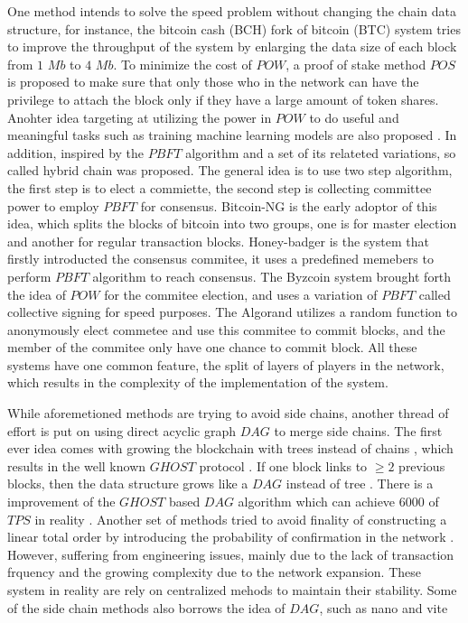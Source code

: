 One method intends to solve the speed problem without changing the chain data structure, for instance, 
the bitcoin cash (BCH) fork of bitcoin (BTC) system tries to improve the throughput of the system by enlarging the data size of each block from $1$ $Mb$ to $4$ $Mb$. 
To minimize the cost of $POW$, a proof of stake method $POS$ \cite{wood2014ethereum} is proposed to make sure that only those who in the network can have the privilege to attach the block only if they have a large amount of token shares.
Anohter idea targeting at utilizing the power in $POW$ to do useful and meaningful tasks such as training machine learning models are also proposed \cite{matthew2017aion}.
In addition, inspired by the $PBFT$ algorithm \cite{castro1999practical} and a set of its relateted variations, so called hybrid chain was proposed. 
The general idea is to use two step algorithm, the first step is to elect a commiette, the second step is collecting committee power to employ $PBFT$ for consensus.
Bitcoin-NG \cite{eyal2016bitcoin} is the early adoptor of this idea, which splits the blocks of bitcoin into two groups, one is for master election and another for regular transaction blocks. 
Honey-badger \cite{miller2016honey} is the system that firstly introducted the consensus commitee, it uses a predefined memebers to perform $PBFT$ algorithm to reach consensus.  
The Byzcoin system \cite{kogias2016enhancing} brought forth the idea of $POW$ for the commitee election, and uses a variation of $PBFT$ called collective signing for speed purposes.
The Algorand \cite{gilad2017algorand} utilizes a random function to anonymously elect commetee and use this commitee to commit blocks, and the member of the commitee only have one chance to commit block.
All these systems have one common feature, the split of layers of players in the network, which results in the complexity of the implementation of the system.

While aforemetioned methods are trying to avoid side chains, another thread of effort is put on using direct acyclic graph $DAG$ to merge side chains.
The first ever idea comes with growing the blockchain with trees instead of chains \cite{sompolinsky2013accelerating}, which results in the well known $GHOST$ protocol \cite{sompolinsky2015secure}.
If one block links to $\geq 2$ previous blocks, then the data structure grows like a $DAG$ instead of tree \cite{sompolinsky2016spectre, sompolinskyphantom, lewenberg2015inclusive}.
There is a improvement of the $GHOST$ based $DAG$ algorithm which can achieve $6000$ of $TPS$ in reality \cite{li2018scaling}.
Another set of methods tried to avoid finality of constructing a linear total order by introducing the probability of confirmation in the network \cite{popov2016tangle, churyumov2016byteball}. 
However, suffering from engineering issues, mainly due to the lack of transaction frquency and the growing complexity due to the network expansion.
These system in reality are rely on centralized mehods to maintain their stability.
Some of the side chain methods also borrows the idea of $DAG$, such as nano \cite{lemahieu2018nano} and vite \cite{liuvite}


